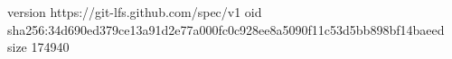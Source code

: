 version https://git-lfs.github.com/spec/v1
oid sha256:34d690ed379ce13a91d2e77a000fc0c928ee8a5090f11c53d5bb898bf14baeed
size 174940
